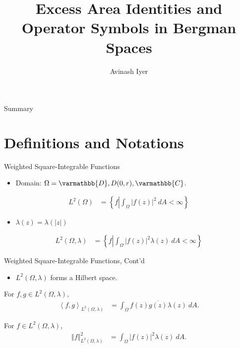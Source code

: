 \documentclass{beamer}
\title[Excess Area Identities and Operator Symbols]{Excess Area Identities and Operator Symbols in Bergman Spaces}
\author{Avinash Iyer}
\institute{Occidental College}
\date{}
\newcommand{\C}{\mathbb{C}}
\newcommand{\iprod}[2]{\left\langle #1,#2 \right\rangle}
\newcommand{\norm}[1]{\left\Vert #1 \right\Vert}
\newcommand{\set}[1]{\left\{#1\right\}}
\renewcommand*{\mathbb}[1]{\varmathbb{#1}}
\begin{document}
\begin{frame}
    \titlepage
\end{frame}
\begin{frame}{Summary}
  \tableofcontents
\end{frame}
\section{Definitions and Notations}
\begin{frame}{Weighted Square-Integrable Functions}
  \begin{itemize}
    \item Domain: $\Omega = \mathbb{D},D(0,r),\C$.
  \end{itemize}
  \begin{definition}[$L^{2}$ Functions]
    \begin{align*}
      L^{2}\left(\Omega\right)&= \set{f\left| \int_{\Omega}^{} \left\vert  f(z) \right\vert^2\:dA < \infty\right.}
    \end{align*}
  \end{definition}
  \begin{itemize}
    \item $\lambda(z) = \lambda(|z|)$
  \end{itemize}
  \begin{definition}
    \begin{align*}
      L^{2}\left(\Omega,\lambda\right)&= \set{f\left| \int_{\Omega}^{} \left\vert  f(z) \right\vert^2\lambda(z)\:dA < \infty\right.}
    \end{align*}
  \end{definition}
\end{frame}
\begin{frame}{Weighted Square-Integrable Functions, Cont'd}
  \begin{itemize}
    \item $L^{2}\left(\Omega,\lambda\right)$ forms a Hilbert space.
  \end{itemize}
  \begin{definition}
    For $f,g\in L^{2}\left(\Omega,\lambda\right)$,
    \begin{align*}
      \iprod{f}{g}_{L^2\left(\Omega,\lambda\right)} &= \int_{\Omega}^{} f(z)\overline{g(z)}\lambda(z)\:dA.
    \end{align*}
  \end{definition}
  \begin{definition}
    For $f\in L^{2}\left(\Omega,\lambda\right)$,
    \begin{align*}
      \norm{f}_{L^{2}\left(\Omega,\lambda\right)}^2 &= \int_{\Omega}^{} \left\vert f(z) \right\vert^2\lambda(z)\:dA.
    \end{align*}
  \end{definition}
\end{frame}
\end{document}
